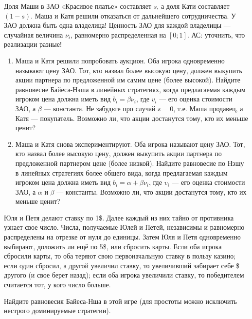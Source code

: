\begin{problem}
Доля Маши в ЗАО «Красивое платье» составляет  $s$, а доля Кати составляет $\left(1-s\right)$. Маша и Катя решили отказаться от дальнейшего сотрудничества. У ЗАО должна быть одна владелица!
Ценность ЗАО для каждой владелицы — случайная величина  $\nu _{i}$, равномерно распределенная на  $\left[0;1\right]$. {\red АС: уточнить, что реализации разные!}\par
\begin{enumerate}
\item	Маша и Катя решили попробовать аукцион. Оба игрока одновременно называют цену ЗАО. Тот, кто назвал более высокую цену, должен выкупить акции партнера по предложенной им самим цене (более высокой). Найдите равновесие Байеса-Нэша в линейных стратегиях, когда предлагаемая каждым игроком цена должна иметь вид  $b_{i} =\beta \nu _{i} $, где  $v_{i} $  — его оценка стоимости ЗАО, а   $\beta $  — константа. Не забудьте про случай  $s=0$, т.е. Маша продавец, а Катя — покупатель. Возможно ли, что акции достанутся тому, кто их меньше ценит?\par
\item 	Маша и Катя снова экспериментируют. Оба игрока называют цену ЗАО. Тот, кто назвал более высокую цену, должен выкупить акции партнера по предложенной партнером цене (более низкой). Найдите равновесие по Нэшу в линейных стратегиях более общего вида, когда предлагаемая каждым игроком цена должна иметь вид  $b_{i} =\alpha +\beta \nu _{i} $, где  $v_{i} $  — его оценка стоимости ЗАО, а  $\alpha $  и  $\beta $  — константы. Возможно ли, что акции достанутся тому, кто их меньше ценит?\par
\end{enumerate}


\begin{sol}

\end{sol}
\end{problem}



\begin{problem}
Юля и Петя делают ставку по 1\$. Далее каждый из них тайно от противника узнает свое число. Числа, получаемые Юлей и Петей, независимы и равномерно распределены на отрезке от нуля до единицы. Затем Юля и Петя одновременно выбирают, доложить ли ещё по 5\$, или сбросить карты. Если оба игрока сбросили карты, то оба теряют свою первоначальную ставку в пользу казино; если один сбросил, а другой увеличил ставку, то увеличивший забирает себе {\$ другого (и свое берет назад)}; если оба игрока увеличили ставку, то победителем считается тот, у кого число больше.\par
Найдите равновесия Байеса-Нша в этой игре (для простоты можно исключить нестрого доминируемые стратегии).\par



\begin{sol}

\end{sol}
\end{problem}



